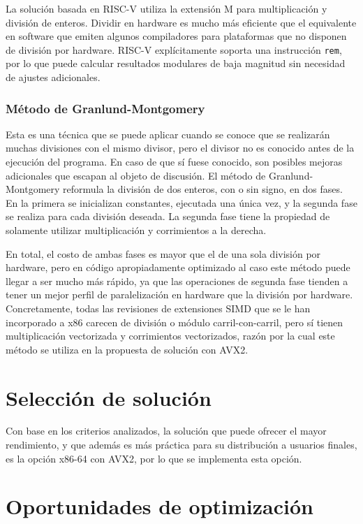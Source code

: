 \documentclass[conference, 14pt]{IEEEtran}
\begin{document}
La solución basada en RISC-V utiliza la extensión M\parencite[sec.~7]{rv-spec}
	  para multiplicación y división de enteros. Dividir en hardware es mucho
	  más eficiente que el equivalente en software que emiten algunos
	  compiladores para plataformas que no disponen de división por hardware.
	  RISC-V explícitamente soporta una instrucción \texttt{rem}, por lo que
	  puede calcular resultados modulares de baja magnitud sin necesidad de
	  ajustes adicionales.

\subsubsection{Método de Granlund-Montgomery}

Esta\parencite{divcnst} es una técnica que se puede aplicar cuando se conoce
que se realizarán muchas divisiones con el mismo divisor, pero el divisor no es
conocido antes de la ejecución del programa. En caso de que sí fuese conocido,
son posibles mejoras adicionales que escapan al objeto de discusión. El método
de Granlund-Montgomery reformula la división de dos enteros, con o sin signo,
en dos fases. En la primera se inicializan constantes, ejecutada una única vez,
y la segunda fase se realiza para cada división deseada. La segunda fase tiene
la propiedad de solamente utilizar multiplicación y corrimientos a la derecha.

En total, el costo de ambas fases es mayor que el de una sola división por
hardware, pero en código apropiadamente optimizado al caso este método puede
llegar a ser mucho más rápido, ya que las operaciones de segunda fase tienden a
tener un mejor perfil de paralelización en hardware que la división por
hardware. Concretamente, todas las revisiones de extensiones SIMD que se le han
incorporado a x86 carecen de división o módulo carril-con-carril, pero sí
tienen multiplicación vectorizada y corrimientos vectorizados, razón por la
cual este método se utiliza en la propuesta de solución con AVX2.

\section{Selección de solución}

Con base en los criterios analizados, la solución que puede ofrecer el mayor
rendimiento, y que además es más práctica para su distribución a usuarios
finales, es la opción x86-64 con AVX2, por lo que se implementa esta opción.

\section{Oportunidades de optimización}
\end{document}
